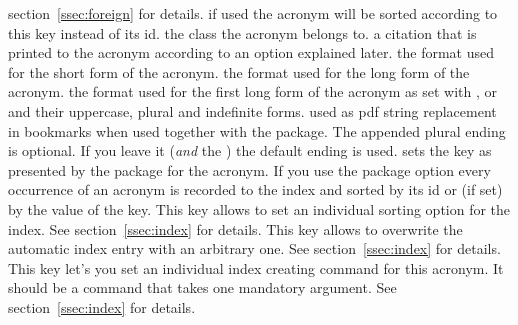 \documentclass[DIV10,toc=index,toc=bib,hyperfootnotes=false]{cnpkgdoc}
\makeatletter
\providecommand*\sinceversion[1]{%
  \@bsphack
  \marginnote{%
    \footnotesize\sffamily\RaggedRight
    \textcolor{black!75}{Introduced in version~#1}}%
  \@esphack}
\makeatother
\begin{document}
\begin{beschreibung}
   section~\ref{ssec:foreign} for details.
 \newline
   if used the acronym will be sorted according to this key instead of its \acs{id}.
 \newline
   the class the acronym belongs to.
 \newline
   a citation that is printed to the acronym according to an option explained later.
 \newline
   the format used for the short form of the acronym.
 \newline
   the format used for the long form of the acronym.
 \newline
   the format used for the first long form of the acronym as set with ,
    or  and their uppercase, plural and indefinite forms.
 \newline
   used as \acs{pdf} string replacement in bookmarks when used together with the
    package. The appended plural ending is optional. If you
   leave it (\emph{and} the \code{/}) the default ending is used.
 \newline
   sets the  key as presented by the  package
   for the acronym.
 \newline
   \sinceversion{1.1}If you use the package option  every occurrence
   of an acronym is recorded to the index and sorted by its \ac{id} or (if set)
   by the value of the  key. This key allows to set an individual
   sorting option for the index. See section~\ref{ssec:index} for details.
 \newline
   \sinceversion{1.1}This key allows to overwrite the automatic index entry with
   an arbitrary one. See section~\ref{ssec:index} for details.
 \newline
   \sinceversion{1.1}This key let's you set an individual index creating command
   for this acronym. It should be a command that takes one mandatory argument.
   See section~\ref{ssec:index} for details.
\end{beschreibung}
\end{document}
